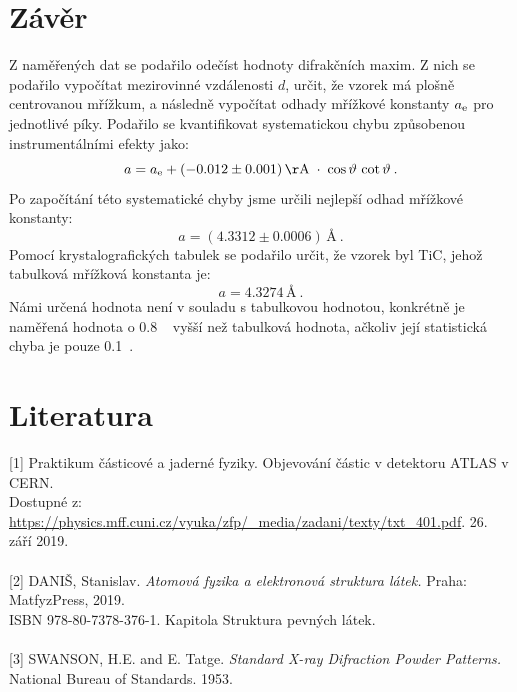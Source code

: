 \documentclass[10pt,a4paper]{article}
\renewcommand{\U}[1]{\ensuremath{\,\mathrm{#1}}}
\newcommand{\°}{\degree}
\begin{document}
\section{Závěr}
Z naměřených dat se podařilo odečíst hodnoty difrakčních maxim. Z nich se podařilo vypočítat mezirovinné vzdálenosti $d$, určit, že vzorek má plošně centrovanou mřížkum, a následně vypočítat odhady mřížkové konstanty $a_{\rm e}$ pro jednotlivé píky.
Podařilo se kvantifikovat systematickou chybu způsobenou instrumentálními efekty jako:
\begin{equation*}
    a = a_{\rm e} + (-0.012 \pm 0.001) \U{Å} \; \cdot \; \cos \vartheta \, \cot \vartheta \: .
\end{equation*}
Po započítání této systematické chyby jsme určili nejlepší odhad mřížkové konstanty:
\begin{equation*}
    a = (4.3312 \pm 0.0006) \U{Å} \: .
\end{equation*}
Pomocí krystalografických tabulek se podařilo určit, že vzorek byl TiC, jehož tabulková mřížková konstanta je:
\begin{equation*}
    a = 4.3274 \U{Å} \: .
\end{equation*}
Námi určená hodnota není v souladu s tabulkovou hodnotou, konkrétně je naměřená hodnota o 0.8~\textperthousand $\;$ vyšší než tabulková hodnota, ačkoliv její statistická chyba je pouze 0.1~\textperthousand.

\section{Literatura}
[1] Praktikum částicové a jaderné fyziky. Objevování částic v detektoru ATLAS v CERN. \\ Dostupné z: \url{https://physics.mff.cuni.cz/vyuka/zfp/_media/zadani/texty/txt_401.pdf}. 26. září 2019.
\\\\
{}[2] DANIŠ, Stanislav. \textit{Atomová fyzika a elektronová struktura látek.} Praha: MatfyzPress, 2019. \\ ISBN 978-80-7378-376-1. Kapitola Struktura pevných látek.
\\\\
{}[3] SWANSON, H.E. and E. Tatge. \textit{Standard X-ray Difraction Powder Patterns.} National Bureau of Standards. 1953.
\end{document}
